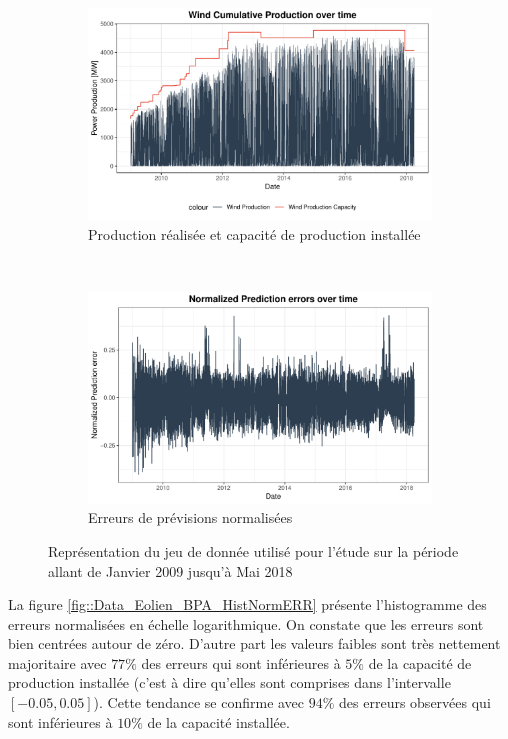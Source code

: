 \documentclass[12pt]{report}
\begin{document}
\begin{figure}[ht!]
\begin{center}
\begin{subfigure}[b]{0.45\textwidth}
	\includegraphics[width=\textwidth]{Images/Data/Eolien/BPA/Normalize.pdf}
	\caption{Production réalisée et capacité de production installée}
	\label{fig::PredErrors_all}
\end{subfigure}
~
\begin{subfigure}[b]{0.45\textwidth}
	\includegraphics[width=\textwidth]{Images/Data/Eolien/BPA/NormWindErrs_All.pdf}
	\caption{Erreurs de prévisions normalisées }
	\label{fig:Data_BPA_WholeNorm}
\end{subfigure}
\caption{Représentation du jeu de donnée utilisé pour l'étude sur la période  allant de Janvier 2009 jusqu'à Mai 2018 }
\label{fig::DataPres}	
\end{center}
\end{figure}

La figure \ref{fig::Data_Eolien_BPA_HistNormERR} présente l'histogramme des erreurs normalisées en échelle logarithmique. On constate que les erreurs sont bien centrées autour de zéro. D'autre part les valeurs faibles sont très nettement majoritaire avec $77 \%$ des erreurs qui sont inférieures à $5 \%$ de la capacité de production installée (c'est à dire qu'elles sont comprises dans l'intervalle $[-0.05,0.05]$). Cette tendance se confirme avec $94 \%$ des erreurs observées qui sont inférieures à $10 \%$ de la capacité installée.
\end{document}
